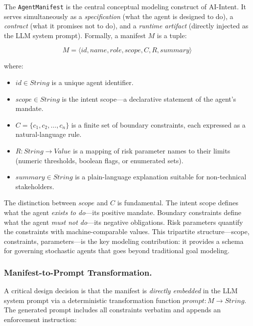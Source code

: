 \documentclass[runningheads]{llncs}
\begin{document}
The \texttt{AgentManifest} is the central conceptual modeling construct of AI-Intent. It serves simultaneously as a \emph{specification} (what the agent is designed to do), a \emph{contract} (what it promises not to do), and a \emph{runtime artifact} (directly injected as the LLM system prompt). Formally, a manifest $M$ is a tuple:

\begin{equation}
M = \langle id, name, role, \mathit{scope}, C, R, \mathit{summary} \rangle
\end{equation}

\noindent where:
\begin{itemize}
    \item $id \in \mathit{String}$ is a unique agent identifier.
    \item $\mathit{scope} \in \mathit{String}$ is the intent scope---a declarative statement of the agent's mandate.
    \item $C = \{c_1, c_2, \ldots, c_n\}$ is a finite set of boundary constraints, each expressed as a natural-language rule.
    \item $R: \mathit{String} \rightarrow \mathit{Value}$ is a mapping of risk parameter names to their limits (numeric thresholds, boolean flags, or enumerated sets).
    \item $\mathit{summary} \in \mathit{String}$ is a plain-language explanation suitable for non-technical stakeholders.
\end{itemize}

The distinction between $\mathit{scope}$ and $C$ is fundamental. The intent scope defines what the agent \emph{exists to do}---its positive mandate. Boundary constraints define what the agent \emph{must not do}---its negative obligations. Risk parameters quantify the constraints with machine-comparable values. This tripartite structure---scope, constraints, parameters---is the key modeling contribution: it provides a schema for governing stochastic agents that goes beyond traditional goal modeling.

\subsubsection{Manifest-to-Prompt Transformation.}

A critical design decision is that the manifest is \emph{directly embedded} in the LLM system prompt via a deterministic transformation function $\mathit{prompt}: M \rightarrow \mathit{String}$. The generated prompt includes all constraints verbatim and appends an enforcement instruction:
\end{document}
